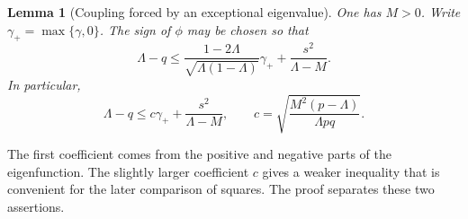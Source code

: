 \documentclass[11pt]{article}
\numberwithin{equation}{section}
\newtheorem{lemma}[theorem]{Lemma}
\begin{document}
\begin{lemma}[Coupling forced by an exceptional eigenvalue]\label{lem:comp}
One has $M>0$. Write $\gamma_+=\max\{\gamma,0\}$.
The sign of $\phi$ may be chosen so that
\begin{equation}\label{eq:naturalcomp}
 \Lambda-q\le
 \frac{1-2\Lambda}{\sqrt{\Lambda(1-\Lambda)}}\gamma_+
 +\frac{s^2}{\Lambda-M}.
\end{equation}
In particular,
\begin{equation}\label{eq:comp}
 \Lambda-q\le c\gamma_++\frac{s^2}{\Lambda-M},
 \qquad c=\sqrt{\frac{M^2(p-\Lambda)}{\Lambda pq}}.
\end{equation}
\end{lemma}
The first coefficient comes from the positive and negative parts of
the eigenfunction. The slightly larger coefficient $c$ gives a weaker
inequality that is convenient for the later comparison of squares.
The proof separates these two assertions.
\end{document}
